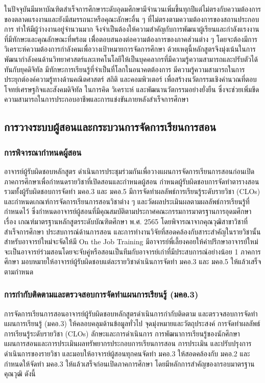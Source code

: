 ในปัจจุบันมีมหาบัณฑิตสำเร็จการศึกษาระดับอุดมศึกษามีจำนวนเพิ่มขึ้นทุกปีแต่ไม่ตรงกับความต้องการของตลาดแรงงานและยังมีสมรรถนะหรือคุณะลักษะอื่น ๆ ที่ไม่ตรงตามความต้องการของสถานประกอบการ ทำให้มีผู้ว่างงานอยู่จำนวนมาก จึงจำเป็นต้องให้ความสำคัญกับการพัฒนาผู้เรียนและกำลังแรงงานที่มีทักษะและคุณลักษณะที่พร้อม เพื่ิอตอบสนองต่อความต้องการของภาคส่วนต่าง ๆ โดยจะต้องมีการวิเคราะห์ความต้องการกำลังคนเพื่อวางเป้าหมายการจัดการศึกษา ด้วยเหตุนี้หลักสูตรจึงมุ่งเน้นในการพัฒนากำลังคนด้านวิทยาศาสตร์และเทคโนโลยีให้เป็นบุคคลากรที่มีความรู้ความสามารถและปรับตัวได้ทันกับยุคดิจิทัล มีทักษะการเรียนรู้ที่จำเป็นที่โลกในอนาคตต้องการ มีความรู้ความสามารถในการประยุกต์องค์ความรู้ทางด้านคณิตศาสตร์ สถิติ และคอมพิวเตอร์ เพื่อสร้างนวัตกรรมเชิงคำนวณที่ตอบโจทย์เศรษฐกิจและสังคมดิจิทัล ในการคิด วิเคราะห์ และพัฒนานวัตกรรมอย่างยั่งยืน ซึ่งจะช่วยเพิ่มขีดความสามารถในการประกอบอาชีพและการแข่งขันภายหลังสำเร็จการศึกษา








\subsection{การวางระบบผู้สอนและกระบวนการจัดการเรียนการสอน}
\subsubsection{การพิจารณากำหนดผู้สอน}
อาจารย์ผู้รับผิดชอบหลักสูตร ดำเนินการประชุมร่วมกันเพื่อวางแผนการจัดการเรียนการสอนก่อนเปิดภาคการศึกษาเพื่อกำหนดรายวิชาที่เปิดสอนและกำหนดผู้สอน กำหนดผู้รับผิดชอบการจัดทำตารางสอน รวมทั้งผู้รับผิดชอบการจัดทำ มคอ.3 และ มคอ.5 มีการจัดทำผลลัพธ์การเรียนรู้ระดับรายวิชา (CLOs) และกำหนดเกณฑ์การจัดการเรียนการสอนวิชาต่าง ๆ และวัดผลประเมินผลตามผลลัพธ์การเรียนรู้ที่กำหนดไว้ ซึ่งกำหนดอาจารย์ผู้สอนที่มีคุณสมบัติตามประกาศคณะกรรมการมาตรฐานการอุดมศึกษา เรื่อง เกณฑ์มาตรฐานหลักสูตรระดับบัณฑิตศึกษา พ.ศ. 2565 โดยพิจารณาจากคุณวุฒิสาขาวิชาที่สำเร็จการศึกษา ประสบการณ์ด้านการสอน และการทำงานวิจัยที่สอดคล้องกับสาระสำคัญในรายวิชานั้น สำหรับอาจารย์ใหม่จะจัดให้มี On the Job Training มีอาจารย์พี่เลี้ยงคอยให้คำปรึกษาอาจารย์ใหม่จะเป็นอาจารย์ร่วมสอนโดยจะจับคู่หรือสอนเป็นทีมกับอาจารย์เก่าที่มีประสบการณ์อย่างน้อย 1 ภาคการศึกษา มอบหมายให้อาจารย์ผู้รับผิดชอบแต่ละรายวิชาดำเนินการจัดทำ มคอ.3 และ มคอ.5 ให้แล้วเสร็จตามกำหนด

\subsubsection{การกำกับติดตามและตรวจสอบการจัดทำแผนการเรียนรู้ (มคอ.3)}
การจัดการเรียนการสอนอาจารย์ผู้รับผิดชอบหลักสูตรดำเนินการกำกับติดตาม และตรวจสอบการจัดทำแผนการเรียนรู้ (มคอ.3) ให้คลอบคลุมด้านข้อมูลทั่วไป จุดมุ่งหมายและวัตถุประสงค์ การจัดทำผลลัพธ์การเรียนรู้ระดับรายวิชา (CLOs) ลักษะและการดำเนินการ การพัฒนาการเรียนรู้ของนักศึกษา แผนการสอนและการประเมินผลทรัพยากรประกอบการเรียนการสอน การประเมิน และปรับปรุงการดำเนินการของรายวิชา และมอบให้อาจารย์ผู้สอนทุกคนจัดทำ มคอ.3 ให้สอดคล้องกับ มคอ.2 และกำหนดให้จัดทำ มคอ.3 ให้แล้วเสร็จก่อนเปิดภาคการศึกษา โดยมีหลักการสำคัญของกรอบมาตรฐานคุณวุฒิ ดังนี้

